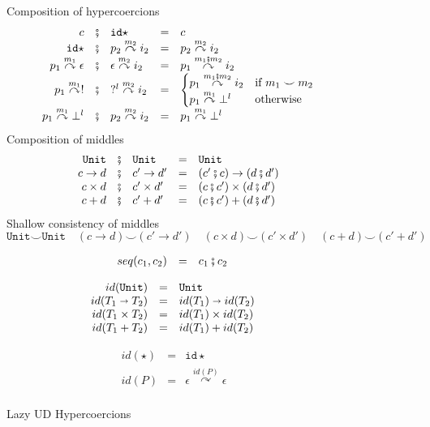 \documentclass[acmsmall,review,anonymous]{acmart}\settopmatter{printfolios=true,printccs=false,printacmref=false}
\newcommand{\funrule}[3]{#1 &=& #2 & #3\\}
\newcommand{\plus}[0]{+}
\newcommand{\POOunit}[0]{\mathtt{Unit}}
\newcommand{\POOfun}[2]{#1 \shortrightarrow #2}
\newcommand{\POOprod}[2]{#1 \times #2}
\newcommand{\POOsum}[2]{#1 \plus #2}
\newcommand{\hyperCoercionI}[0]{\mathtt{id\star}}
\newcommand{\hyperCoercionC}[3]{#1 \overset{#2}{\curvearrowright} #3}
\begin{document}
\begin{figure}
  Composition of hypercoercions 
  \[
  \begin{array}{rclclr}
  c &\fatsemi& \hyperCoercionI{} &=& c\\
  \hyperCoercionI{} &\fatsemi& \hyperCoercionC{p_2}{m_2}{i_2} &=&
       \hyperCoercionC{p_2}{m_2}{i_2} \\
  \hyperCoercionC{p_1}{m_1}{\epsilon} &\fatsemi& \hyperCoercionC{\epsilon}{m_2}{i_2} &=&
       \hyperCoercionC{p_1}{m_1 \fatsemi m_2}{i_2} \\
  \hyperCoercionC{p_1}{m_1}{!} &\fatsemi& \hyperCoercionC{?^l}{m_2}{i_2} &=&
  \begin{cases}
    \hyperCoercionC{p_1}{m_1 \fatsemi m_2}{i_2} & \text{if } m_1 \smile m_2 \\
    \hyperCoercionC{p_1}{m_1}{\bot^l} & \text{otherwise}
  \end{cases} \\
  \hyperCoercionC{p_1}{m_1}{\bot^l} &\fatsemi& \hyperCoercionC{p_2}{m_2}{i_2} &=&
     \hyperCoercionC{p_1}{m_1}{\bot^l}
  \end{array}
  \]
  Composition of middles 
  \[
  \begin{array}{rclclr}  
  \POOunit &\fatsemi& \POOunit &=& \POOunit \\
  c \to d &\fatsemi& c' \to d' &=& (c' \fatsemi c) \to (d \fatsemi d') \\
  c \times d &\fatsemi& c' \times d' &=& (c \fatsemi c') \times (d \fatsemi d') \\
  c + d &\fatsemi& c' + d' &=& (c \fatsemi c') + (d \fatsemi d')
  \end{array}
  \]
  Shallow consistency of middles 
  \[
  \POOunit \smile \POOunit \quad
  (c \to d) \smile (c' \to d') \quad
  (c \times d) \smile (c' \times d') \quad
  (c + d) \smile (c' + d')
  \]

  \[
  \begin{array}{rclr}
    \funrule{seq(c_1,c_2)}{
      c_1 \fatsemi c_2
    }{}
  \end{array}
  \]
  
  \[
  \begin{array}{rclr}
    \funrule{id(\POOunit)}{\POOunit}{}
    \funrule{id(\POOfun{T_1}{T_2})}{
    \POOfun{id(T_1)}{id(T_2)}
    }{}
    \funrule{id(\POOprod{T_1}{T_2})}{
    \POOprod{id(T_1)}{id(T_2)}
    }{}
    \funrule{id(\POOsum{T_1}{T_2})}{
    \POOsum{id(T_1)}{id(T_2)}
    }{}
  \end{array}
  \]
  
  \[
  \begin{array}{rclr}
    \funrule{id(\star)}{
    \hyperCoercionI
    }{}
    \funrule{id(P)}{
    \hyperCoercionC{\epsilon}{id(P)}{\epsilon}
    }{}
  \end{array}
  \]
  \caption{Lazy UD Hypercoercions}
  \label{fig:HC-UD}
\end{figure}
\end{document}
